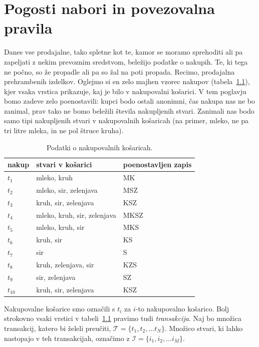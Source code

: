 \chapter{Pogosti nabori in povezovalna pravila}

Danes vse prodajalne, tako spletne kot te, kamor se moramo sprehoditi ali pa zapeljati z nekim prevoznim sredstvom, beležijo podatke o nakupih. Te, ki tega ne počno, so že propadle ali pa so žal na poti propada. Recimo, prodajalna prehrambenih izdelkov. Oglejmo si en zelo majhen vzorec nakupov  (tabela~\ref{t:transakcije}), kjer vsaka vrstica prikazuje, kaj je bilo v nakupovalni košarici. V tem poglavju bomo zadeve zelo poenostavili: kupci bodo ostali anonimni, čas nakupa nas ne bo zanimal, prav tako ne bomo beležili števila nakupljenih stvari. Zanimali nas bodo samo tipi nakupljenih stvari v nakupovalnih košaricah (na primer, mleko, ne pa tri litre mleka, in ne pol štruce kruha).

\begin{table}
\caption{Podatki o nakupovalnih košaricah.}
\label{t:transakcije}
\begin{center}
\small
\begin{tabular}{lll}
\toprule
nakup & stvari v košarici & poenostavljen zapis \\
\midrule
$t_1$ & mleko, kruh & MK \\
$t_2$ & mleko, sir, zelenjava & MSZ \\
$t_3$ & kruh, sir, zelenjava & KSZ \\
$t_4$ & mleko, kruh, sir, zelenjava & MKSZ \\
$t_5$ & mleko, kruh, sir & MKS \\
$t_6$ & kruh, sir & KS \\
$t_7$ & sir & S \\
$t_8$ & kruh, zelenjava, sir & KZS \\
$t_9$ & sir, zelenjava & SZ \\
$t_{10}$ & kruh, sir, zelenjava & KSZ \\
\bottomrule
\end{tabular}
\end{center}
\end{table}

Nakupovalne košarice smo označili s $t_i$ za $i$-to nakupovalno košarico. Bolj strokovno vsaki vrstici v tabeli~\ref{t:transakcije} pravimo tudi {\em transakcija}. Naj bo množica transakcij, katero bi želeli preučiti, ${\mathcal T}=\{t_1,t_2,\ldots t_N\}$. Množico stvari, ki lahko nastopajo v teh transakcijah, označimo z ${\mathcal I}=\{i_1,i_2,\ldots i_M\}$.

